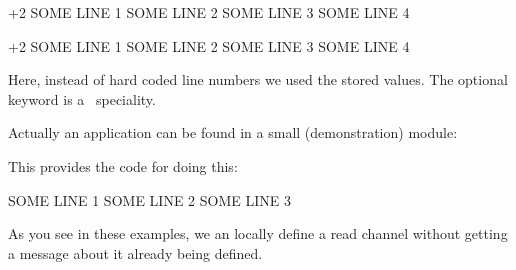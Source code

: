 \starttyping[option=TEX]
\integerdef\StartHere\numexpr{}+2\relax
\starthiding
SOME LINE 1
SOME LINE 2
SOME LINE 3
SOME LINE 4
\stophiding
\integerdef\StopHere\numexpr{}\relax
\stoptyping


\integerdef\StartHere\numexpr{}+2\relax
\starthiding
SOME LINE 1
SOME LINE 2
SOME LINE 3
SOME LINE 4
\stophiding
\integerdef\StopHere\numexpr{}\relax

\startbuffer
\begingroup
  \newlocalread\myreada
  \immediate\openin{}
  \blank
  \immediate\closein\myreada
\endgroup
\stopbuffer

\typebuffer[option=TEX]

Here, instead of hard coded line numbers we used the stored values. The
optional  keyword is a \LMTX\ speciality.

\startlines \getbuffer \stoplines

Actually an application can be found in a small (demonstration) module:

\startbuffer
{}
\stopbuffer

\typebuffer[option=TEX] \getbuffer

This provides the code for doing this:

\starttyping[option=TEX]
\startmarkedlines[test]
SOME LINE 1
SOME LINE 2
SOME LINE 3
\stopmarkedlines

\begingroup
  \newlocalread\myreada
  \immediate\openin{}
  \immediate\closein\myreada
\endgroup
\stoptyping

As you see in these examples, we an locally define a read channel without
getting a message about it already being defined.

\stopsection

\stopdocument


